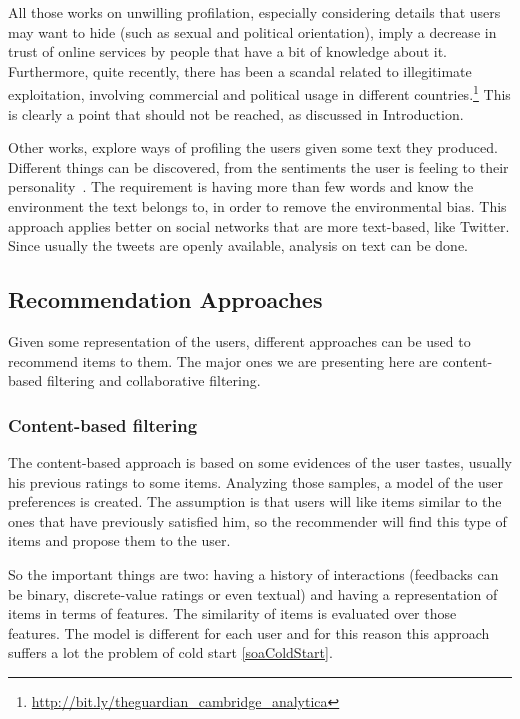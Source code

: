 All those works on unwilling profilation, especially considering details that users may want to hide (such as sexual and political orientation), imply a decrease in trust of online services by people that have a bit of knowledge about it. Furthermore, quite recently, there has been a scandal related to illegitimate exploitation, involving commercial and political usage in different countries.\footnote{\url{http://bit.ly/theguardian_cambridge_analytica}} This is clearly a point that should not be reached, as discussed in Introduction.

Other works, explore ways of profiling the users given some text they produced. Different things can be discovered, from the sentiments the user is feeling to their personality~\cite{mairesse2007using}. The requirement is having more than few words and know the environment the text belongs to, in order to remove the environmental bias. This approach applies better on social networks that are more text-based, like Twitter. Since usually the tweets are openly available, analysis on text can be done.

\subsection{Recommendation Approaches}
\label{soaPersonalizationRec}

Given some representation of the users, different approaches can be used to recommend items to them. The major ones we are presenting here are content-based filtering and collaborative filtering.

\subsubsection{Content-based filtering}
The content-based approach is based on some evidences of the user tastes, usually his previous ratings to some items. Analyzing those samples, a model of the user preferences is created. The assumption is that users will like items similar to the ones that have previously satisfied him, so the recommender will find this type of items and propose them to the user.

So the important things are two: having a history of interactions (feedbacks can be binary, discrete-value ratings or even textual) and having a representation of items in terms of features. The similarity of items is evaluated over those features. The model is different for each user and for this reason this approach suffers a lot the problem of cold start \ref{soaColdStart}.

